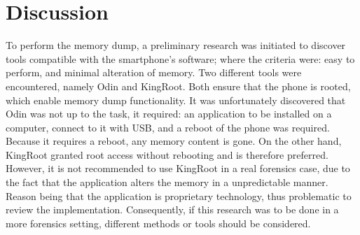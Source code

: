\section{Discussion}
To perform the memory dump, a preliminary research was initiated to discover tools compatible with the smartphone's software; where the criteria were: easy to perform, and minimal alteration of memory. Two different tools were encountered, namely Odin and KingRoot. Both ensure that the phone is rooted, which enable memory dump functionality.
It was unfortunately discovered that Odin was not up to the task, it required: an application to be installed on a computer, connect to it with USB, and a reboot of the phone was required. Because it requires a reboot, any memory content is gone. On the other hand, KingRoot granted root access without rebooting and is therefore preferred. However, it is not recommended to use KingRoot in a real forensics case, due to the fact that the application alters the memory in a unpredictable manner. %
 Reason being that the application is proprietary technology, thus problematic to review the implementation. Consequently, if this research was to be done in a more forensics setting, different methods or tools should be considered. 
